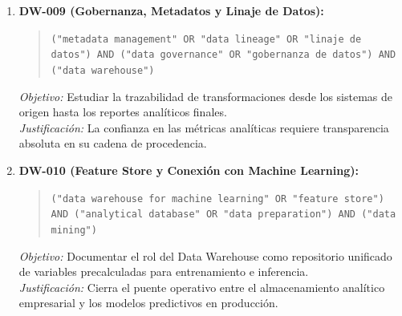 \begin{enumerate}
  \textit{Justificación:} Elimina la tradicional ventana nocturna de carga batch en favor de analítica operativa continua.
  \item \textbf{DW-009 (Gobernanza, Metadatos y Linaje de Datos):}
  \begin{quote}
  \texttt{("metadata management" OR "data lineage" OR "linaje de datos") AND ("data governance" OR "gobernanza de datos") AND ("data warehouse")}
  \end{quote}
  \textit{Objetivo:} Estudiar la trazabilidad de transformaciones desde los sistemas de origen hasta los reportes analíticos finales.\\
  \textit{Justificación:} La confianza en las métricas analíticas requiere transparencia absoluta en su cadena de procedencia.
  \item \textbf{DW-010 (Feature Store y Conexión con Machine Learning):}
  \begin{quote}
  \texttt{("data warehouse for machine learning" OR "feature store") AND ("analytical database" OR "data preparation") AND ("data mining")}
  \end{quote}
  \textit{Objetivo:} Documentar el rol del Data Warehouse como repositorio unificado de variables precalculadas para entrenamiento e inferencia.\\
  \textit{Justificación:} Cierra el puente operativo entre el almacenamiento analítico empresarial y los modelos predictivos en producción.
\end{enumerate}


